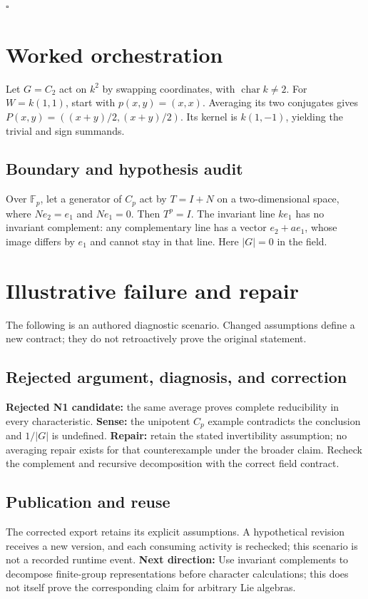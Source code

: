 \documentclass[preprint,12pt,aps,pra,showkeys,amsmath,amssymb,superscriptaddress,floatfix]{revtex4-2}
\theoremstyle{definition}
\theoremstyle{remark}
\begin{document}
\hfill$\square$

\section{Worked orchestration}

Let \(G=C_2\) act on \(k^2\) by swapping coordinates, with
\(\operatorname{char}k\ne2\). For \(W=k(1,1)\), start with
\(p(x,y)=(x,x)\). Averaging its two conjugates gives
\(P(x,y)=((x+y)/2,(x+y)/2)\). Its kernel is \(k(1,-1)\), yielding the
trivial and sign summands.

\subsection{Boundary and hypothesis audit}

Over \(\mathbb F_p\), let a generator of \(C_p\) act by \(T=I+N\) on a
two-dimensional space, where \(N e_2=e_1\) and \(N e_1=0\). Then
\(T^p=I\). The invariant line \(k e_1\) has no invariant complement: any
complementary line has a vector \(e_2+a e_1\), whose image differs by
\(e_1\) and cannot stay in that line. Here \(|G|=0\) in the field.

\section{Illustrative failure and repair}

The following is an authored diagnostic scenario. Changed assumptions
define a new contract; they do not retroactively prove the original
statement.

\subsection{Rejected argument, diagnosis, and correction}
\textbf{Rejected N1 candidate:} the same average proves complete
reducibility in every characteristic. \textbf{Sense:} the unipotent
\(C_p\) example contradicts the conclusion and \(1/|G|\) is undefined.
\textbf{Repair:} retain the stated invertibility assumption; no
averaging repair exists for that counterexample under the broader claim.
Recheck the complement and recursive decomposition with the correct
field contract.

\subsection{Publication and reuse}
The corrected export retains its explicit assumptions. A hypothetical
revision receives a new version, and each consuming activity is
rechecked; this scenario is not a recorded runtime event. \textbf{Next
direction:} Use invariant complements to decompose finite-group
representations before character calculations; this does not itself
prove the corresponding claim for arbitrary Lie algebras.
\end{document}

